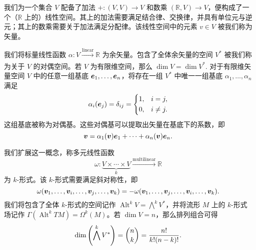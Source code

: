 \documentclass[11pt]{article}
\newcommand{\RR}{\mathbb{R}}
\begin{document}
    我们为一个集合 $V$ 配备了加法 $+: (V, V) \to V$ 和数乘 $(\RR, V) \to V$，便构成了一个（$\RR$ 上的）线性空间。其上的加法需要满足结合律、交换律，并具有单位元与逆元；其上的数乘需要关于加法满足分配律。该线性空间中的元素 $v \in V$ 被我们称为矢量。
    
    我们将标量线性函数 $\alpha: V \xrightarrow[]{\mathrm{linear}} \RR$ 为余矢量。包含了全体余矢量的空间 $V^*$ 被我们称为关于 $V$ 的对偶空间。若 $V$ 为有限维空间，那么 $\dim{V} = \dim{V^*}.$
    对于有限维矢量空间 $V$ 中的任意一组基底 $\vb*{e}_1, \ldots, \vb*{e}_n$，将存在一组 $V^*$ 中唯一一组基底 $\alpha_1, \ldots, \alpha_n$ 满足
    \begin{equation*}
        \alpha_i(\vb*{e}_j) = \delta_{ij} = \begin{dcases}
            1, & i = j, \\
            0, & i \ne j.
        \end{dcases}
    \end{equation*}
    这组基底被称为对偶基。这些对偶基可以提取出矢量在基底下的系数，即
    \[ \vb*{v} = \alpha_1(\vb*{v}) \vb*{e}_1 + \cdots + \alpha_n(\vb*{v}) \vb*{e}_n. \]

    我们扩展这一概念，称多元线性函数
    \[ \omega: \underbrace{V \times \cdots \times V}_k \xrightarrow[]{\mathrm{multilinear}} \RR \]
    为 $k$-形式。该 $k$-形式需要满足斜对称性，即
    \[ \omega(\vb*{v}_1, \ldots, \vb*{v}_i, \ldots, \vb*{v}_j, \ldots, \vb*{v}_k) = -\omega(\vb*{v}_1, \ldots, \vb*{v}_j, \ldots, \vb*{v}_i, \ldots, \vb*{v}_k). \]
    我们将包含了全体 $k$-形式的空间记作 $\operatorname{Alt}^k V = \bigwedge^k V^*$，并将流形 $M$ 上的 $k$-形式场记作 $\Gamma(\operatorname{Alt}^k TM) = \Omega^k(M)$。若 $\dim{V} = n$，那么排列组合可得
    \[ \dim\qty(\bigwedge^k V^*) = \binom{n}{k} = \frac{n!}{k!(n-k)!}. \]
    
\end{document}
